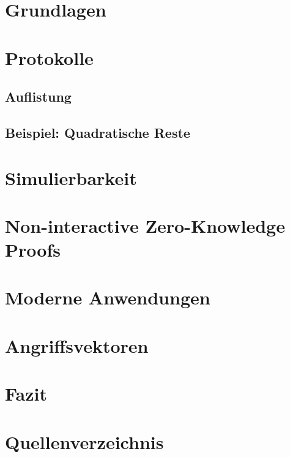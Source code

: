 \documentclass {article}
\begin{document}
\section{Grundlagen}
\section{Protokolle}
\subsection{Auflistung}
\subsection{Beispiel: Quadratische Reste}
\section{Simulierbarkeit}
\section{Non-interactive Zero-Knowledge Proofs}
\section{Moderne Anwendungen}
\section{Angriffsvektoren}
\section{Fazit}
\section{Quellenverzeichnis}
\end{document}
